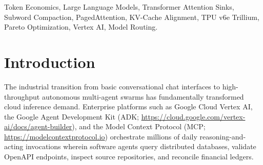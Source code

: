 \documentclass[conference,10pt]{IEEEtran}
\begin{document}
\begin{IEEEkeywords}
Token Economics, Large Language Models, Transformer Attention Sinks, Subword Compaction, PagedAttention, KV-Cache Alignment, TPU v6e Trillium, Pareto Optimization, Vertex AI, Model Routing.
\end{IEEEkeywords}

\section{Introduction}
\label{sec:intro}
The industrial transition from basic conversational chat interfaces to high-throughput autonomous multi-agent swarms has fundamentally transformed cloud inference demand. Enterprise platforms such as Google Cloud Vertex AI, the Google Agent Development Kit (ADK; \url{https://cloud.google.com/vertex-ai/docs/agent-builder}), and the Model Context Protocol (MCP; \url{https://modelcontextprotocol.io}) orchestrate millions of daily reasoning-and-acting invocations \cite{yao2023react, patil2024gorilla} wherein software agents query distributed databases, validate OpenAPI endpoints, inspect source repositories, and reconcile financial ledgers.
\end{document}

